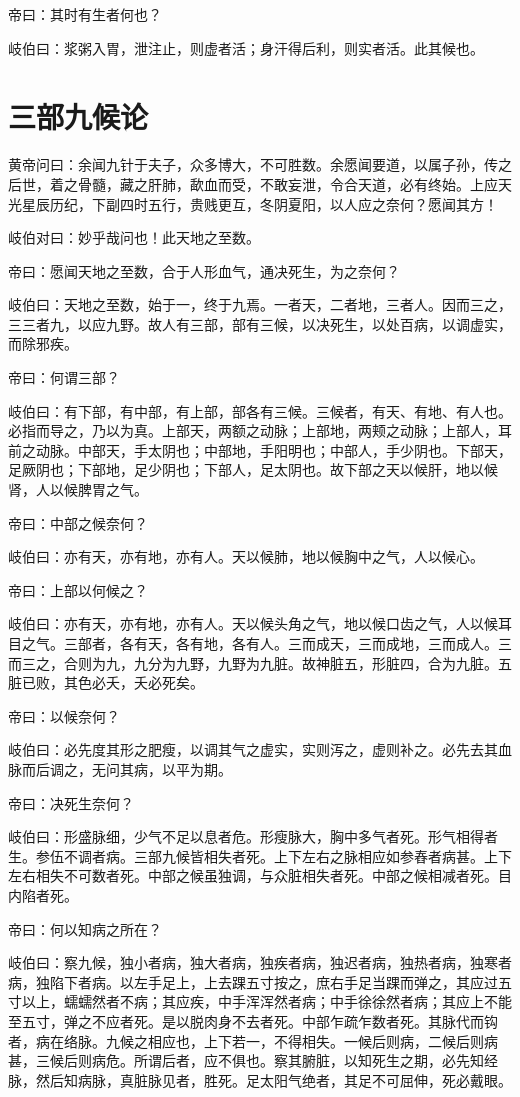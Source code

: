 \documentclass{article}%
\begin{document}
帝曰：其时有生者何也？

岐伯曰：浆粥入胃，泄注止，则虚者活；身汗得后利，则实者活。此其候也。
\section{三部九候论}
黄帝问曰：余闻九针于夫子，众多博大，不可胜数。余愿闻要道，以属子孙，传之后世，着之骨髓，藏之肝肺，歃血而受，不敢妄泄，令合天道，必有终始。上应天光星辰历纪，下副四时五行，贵贱更互，冬阴夏阳，以人应之奈何？愿闻其方！

岐伯对曰：妙乎哉问也！此天地之至数。

帝曰：愿闻天地之至数，合于人形血气，通决死生，为之奈何？

岐伯曰：天地之至数，始于一，终于九焉。一者天，二者地，三者人。因而三之，三三者九，以应九野。故人有三部，部有三候，以决死生，以处百病，以调虚实，而除邪疾。

帝曰：何谓三部？

岐伯曰：有下部，有中部，有上部，部各有三候。三候者，有天、有地、有人也。必指而导之，乃以为真。上部天，两额之动脉；上部地，两颊之动脉；上部人，耳前之动脉。中部天，手太阴也；中部地，手阳明也；中部人，手少阴也。下部天，足厥阴也；下部地，足少阴也；下部人，足太阴也。故下部之天以候肝，地以候肾，人以候脾胃之气。

帝曰：中部之候奈何？

岐伯曰：亦有天，亦有地，亦有人。天以候肺，地以候胸中之气，人以候心。

帝曰：上部以何候之？

岐伯曰：亦有天，亦有地，亦有人。天以候头角之气，地以候口齿之气，人以候耳目之气。三部者，各有天，各有地，各有人。三而成天，三而成地，三而成人。三而三之，合则为九，九分为九野，九野为九脏。故神脏五，形脏四，合为九脏。五脏已败，其色必夭，夭必死矣。

帝曰：以候奈何？

岐伯曰：必先度其形之肥瘦，以调其气之虚实，实则泻之，虚则补之。必先去其血脉而后调之，无问其病，以平为期。

帝曰：决死生奈何？

岐伯曰：形盛脉细，少气不足以息者危。形瘦脉大，胸中多气者死。形气相得者生。参伍不调者病。三部九候皆相失者死。上下左右之脉相应如参舂者病甚。上下左右相失不可数者死。中部之候虽独调，与众脏相失者死。中部之候相减者死。目内陷者死。

帝曰：何以知病之所在？

岐伯曰：察九候，独小者病，独大者病，独疾者病，独迟者病，独热者病，独寒者病，独陷下者病。以左手足上，上去踝五寸按之，庶右手足当踝而弹之，其应过五寸以上，蠕蠕然者不病；其应疾，中手浑浑然者病；中手徐徐然者病；其应上不能至五寸，弹之不应者死。是以脱肉身不去者死。中部乍疏乍数者死。其脉代而钩者，病在络脉。九候之相应也，上下若一，不得相失。一候后则病，二候后则病甚，三候后则病危。所谓后者，应不俱也。察其腑脏，以知死生之期，必先知经脉，然后知病脉，真脏脉见者，胜死。足太阳气绝者，其足不可屈伸，死必戴眼。
\end{document}
